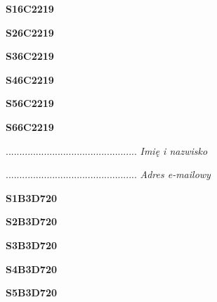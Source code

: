 \begin{turn}{90}\huge \textbf{S16C2219}\end{turn}

\begin{turn}{90}\huge \textbf{S26C2219}\end{turn}

\begin{turn}{90}\huge \textbf{S36C2219}\end{turn}

\begin{turn}{90}\huge \textbf{S46C2219}\end{turn}

\begin{turn}{90}\huge \textbf{S56C2219}\end{turn}

\begin{turn}{90}\huge \textbf{S66C2219}\end{turn}

\begin{turn}{90}\begin{minipage}{\linewidth} \vspace{20mm} ................................................  \textit{Imię i nazwisko}\end{minipage}\end{turn}

\begin{turn}{90}\begin{minipage}{\linewidth} \vspace{20mm} ................................................  \textit{Adres e-mailowy}\end{minipage}\end{turn}

\begin{turn}{90}\huge \textbf{S1B3D720}\end{turn}

\begin{turn}{90}\huge \textbf{S2B3D720}\end{turn}

\begin{turn}{90}\huge \textbf{S3B3D720}\end{turn}

\begin{turn}{90}\huge \textbf{S4B3D720}\end{turn}

\begin{turn}{90}\huge \textbf{S5B3D720}\end{turn}

